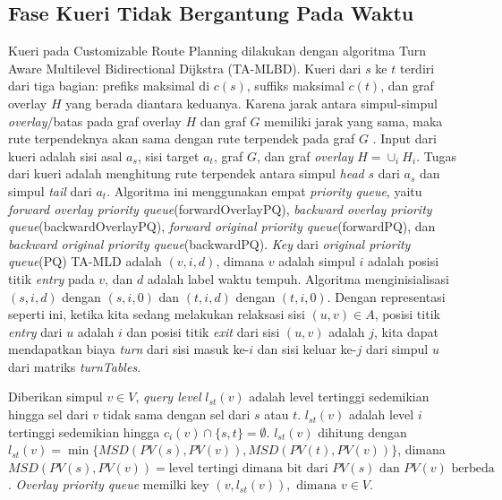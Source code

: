 \subsection{Fase Kueri Tidak Bergantung Pada Waktu}
\label{subsec:tdcrp-kueri}
Kueri pada Customizable Route Planning dilakukan dengan algoritma Turn Aware Multilevel Bidirectional Dijkstra (TA-MLBD). Kueri dari $s$ ke $t$ terdiri dari tiga bagian: prefiks maksimal di $c(s)$, suffiks maksimal $c(t)$, dan graf overlay $H$ yang berada diantara keduanya. Karena jarak antara simpul-simpul \textit{overlay}/batas pada graf overlay $H$ dan graf $G$ memiliki jarak yang sama, maka rute terpendeknya akan sama dengan rute terpendek pada graf $G$ \cite{Delling2015}. Input dari kueri adalah sisi asal $a_s$, sisi target $a_t$, graf $G$, dan graf \textit{overlay} $H =\cup_i H_i$. Tugas dari kueri adalah menghitung rute terpendek antara simpul \textit{head} $s$ dari $a_s$ dan simpul \textit{tail} dari $a_t$. Algoritma ini menggunakan empat \textit{priority queue}, yaitu \textit{forward overlay priority queue}(forwardOverlayPQ), \textit{backward overlay priority queue}(backwardOverlayPQ), \textit{forward original priority queue}(forwardPQ), dan \textit{backward original priority queue}(backwardPQ). \textit{Key} dari \textit{original priority queue}(PQ) TA-MLD adalah $(v,i,d)$, dimana $v$ adalah simpul $i$ adalah posisi titik \textit{entry} pada $v$, dan $d$ adalah label waktu tempuh. Algoritma menginisialisasi $(s,i,d)$ dengan $(s,i,0)$ dan $(t,i,d)$ dengan $(t,i,0)$. Dengan representasi seperti ini, ketika kita sedang melakukan relaksasi sisi $(u,v)\in A$, posisi titik \textit{entry} dari $u$ adalah $i$ dan posisi titik \textit{exit} dari sisi $(u,v)$ adalah $j$, kita dapat mendapatkan biaya \textit{turn}  dari sisi masuk ke-$i$ dan sisi keluar ke-$j$ dari simpul $u$  dari matriks \textit{turnTables}.

Diberikan simpul $v\in V$, \textit{query level} $l_{st}(v)$ adalah level tertinggi sedemikian hingga sel dari $v$ tidak sama dengan sel dari $s$ atau $t$. $l_{st}(v)$ adalah level $i$ tertinggi sedemikian hingga $c_i(v)\cap\{s,t\}=\emptyset$. $l_{st}(v)$ dihitung dengan $l_{st}(v)=\min\{MSD(PV(s), PV(v)), MSD(PV(t), PV(v))\}$, dimana $MSD(PV(s), PV(v))=\text{level tertingi dimana bit dari } PV(s) \text{ dan }PV(v) \text{ berbeda}$. \textit{Overlay priority queue} memilki key $(v, l_{st}(v)),\text{ dimana } v\in V$.

